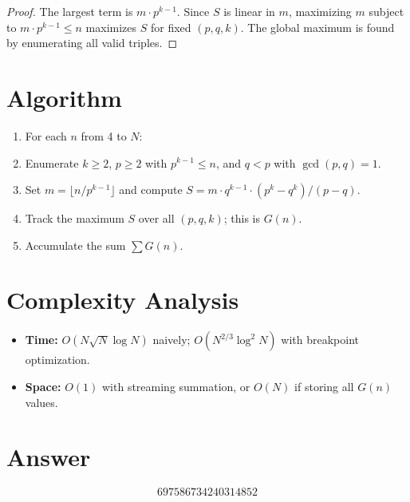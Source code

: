 \documentclass[11pt]{article}
\begin{document}
\begin{proof}
The largest term is $m \cdot p^{k-1}$. Since $S$ is linear in $m$, maximizing $m$ subject to $m \cdot p^{k-1} \le n$ maximizes $S$ for fixed $(p, q, k)$. The global maximum is found by enumerating all valid triples.
\end{proof}

\section{Algorithm}

\begin{enumerate}
\item For each $n$ from 4 to $N$:
\item Enumerate $k \ge 2$, $p \ge 2$ with $p^{k-1} \le n$, and $q < p$ with $\gcd(p,q)=1$.
\item Set $m = \lfloor n / p^{k-1} \rfloor$ and compute $S = m \cdot q^{k-1} \cdot (p^k - q^k)/(p-q)$.
\item Track the maximum $S$ over all $(p, q, k)$; this is $G(n)$.
\item Accumulate the sum $\sum G(n)$.
\end{enumerate}

\section{Complexity Analysis}

\begin{itemize}
\item \textbf{Time:} $O(N \sqrt{N} \log N)$ naively; $O(N^{2/3} \log^2 N)$ with breakpoint optimization.
\item \textbf{Space:} $O(1)$ with streaming summation, or $O(N)$ if storing all $G(n)$ values.
\end{itemize}

\section{Answer}

\[
\boxed{697586734240314852}
\]
\end{document}
